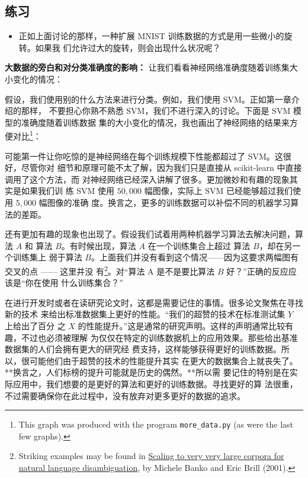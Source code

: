 \subsection*{练习}

\begin{itemize}
\item 正如上面讨论的那样，一种扩展 MNIST 训练数据的方式是用一些微小的旋转。如果我
  们允许过大的旋转，则会出现什么状况呢？
\end{itemize}

\textbf{大数据的旁白和对分类准确度的影响：} 让我们看看神经网络准确度随着训练集大
小变化的情况：

假设，我们使用别的什么方法来进行分类。例如，我们使用 SVM。正如第一章介绍的那样，
不要担心你熟不熟悉 SVM，我们不进行深入的讨论。下面是 SVM 模型的准确度随着训练数据
集的大小变化的情况，我也画出了神经网络的结果来方便对比\footnote{This graph was
  produced with the program \lstinline!more_data.py! (as were the last few
  graphs).}：

可能第一件让你吃惊的是神经网络在每个训练规模下性能都超过了 SVM。这很好，尽管你对
细节和原理可能不太了解，因为我们只是直接从 scikit-learn 中直接调用了这个方法，而
对神经网络已经深入讲解了很多。更加微妙和有趣的现象其实是如果我们训
练 SVM 使用 $50,000$ 幅图像，实际上 SVM 已经能够超过我们使用 $5,000$ 幅图像的准确
度。换言之，更多的训练数据可以补偿不同的机器学习算法的差距。

还有更加有趣的现象也出现了。假设我们试着用两种机器学习算法去解决问题，算法 $A$ 和
算法 $B$。有时候出现，算法 $A$ 在一个训练集合上超过 算法 $B$，却在另一个训练集上
弱于算法 $B$。上面我们并没有看到这个情况——因为这要求两幅图有交叉的点 —— 这里并没
有\footnote{Striking examples may be found in
  \href{http://dx.doi.org/10.3115/1073012.1073017}{Scaling to very very large
    corpora for natural language disambiguation}, by Michele Banko and Eric
  Brill (2001).}。对“算法 A 是不是要比算法 $B$ 好？”正确的反应应该是“你在使用
什么训练集合？”

在进行开发时或者在读研究论文时，这都是需要记住的事情。很多论文聚焦在寻找新的技术
来给出标准数据集上更好的性能。“我们的超赞的技术在标准测试集 $Y$ 上给出了百分
之 $X$ 的性能提升。”这是通常的研究声明。这样的声明通常比较有趣，不过也必须被理解
为仅仅在特定的训练数据机上的应用效果。那些给出基准数据集的人们会拥有更大的研究经
费支持，这样能够获得更好的训练数据。所以，很可能他们由于超赞的技术的性能提升其实
在更大的数据集合上就丧失了。**换言之，人们标榜的提升可能就是历史的偶然。**所以需
要记住的特别是在实际应用中，我们想要的是更好的算法和更好的训练数据。寻找更好的算
法很重，不过需要确保你在此过程中，没有放弃对更多更好的数据的追求。

